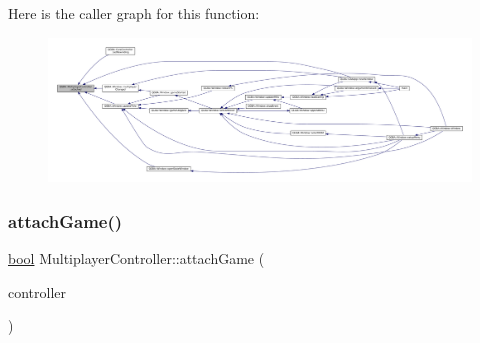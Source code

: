 Here is the caller graph for this function\+:
\nopagebreak
\begin{figure}[H]
\begin{center}
\leavevmode
\includegraphics[width=350pt]{class_q_g_b_a_1_1_multiplayer_controller_a198d9f12525ba6ff641510acaf780ed2_icgraph}
\end{center}
\end{figure}
\mbox{\label{class_q_g_b_a_1_1_multiplayer_controller_a58149beb11ba0c0970cf37f86e74c4f4}} 
\subsubsection{\texorpdfstring{attach\+Game()}{attachGame()}}
{\footnotesize\ttfamily \mbox{\hyperlink{libretro_8h_a4a26dcae73fb7e1528214a068aca317e}{bool}} Multiplayer\+Controller\+::attach\+Game (\begin{DoxyParamCaption}\item[{\mbox{\hyperlink{class_q_g_b_a_1_1_core_controller}{Core\+Controller}} $\ast$}]{controller }\end{DoxyParamCaption})}

